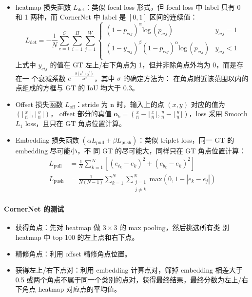 \begin{itemize}
  \item heatmap 损失函数 $L_{\mathrm{det}}$：类似 focal loss 形式，但 focal loss
    中 label 只有 0 和 1 两种，而 CornerNet 中 label 是 $[0, 1]$ 区间的连续值：
    \begin{equation}
      \label{equ:cornernet-det-loss}
      L_{\mathrm{det}} = -\frac{1}{N} \sum_{c=1}^{C} \sum_{i=1}^{H} \sum_{j=1}^{W}
      \left\{
        \begin{array}{lr}
           (1-p_{cij})^{\alpha}\mathrm{log}\,(p_{cij}) & y_{cij} = 1 \\
           (1-y_{cij})^{\beta} (1-p_{cij})^{\alpha} \mathrm{log}\,(p_{cij}) & y_{cij} < 1 \\
        \end{array}
      \right.
    \end{equation}
    上式中 $y_{cij}$ 的值在 GT 左上/右下角点为 1，但并非除角点外均为 0，而是存在一
    个衰减系数 $e^{-\frac{9(x^2+y^2)}{2\sigma^2}}$，其中 $\sigma$ 的确定方法为：
    在角点附近该范围以内的点组成的方框与 GT 的 IoU 均大于 0.3。
  \item Offset 损失函数 $L_{\mathrm{off}}$：stride 为 n 时，输入上的点 $(x, y)$
    对应的值为 $( \lfloor \frac{x}{n} \rfloor, \lfloor \frac{y}{n} \rfloor)$，
    offset 部分的真值 $\mathbf{o}_k = \left( \frac{x}{n} - \lfloor \frac{x}{n}
      \rfloor, \frac{y}{n} - \lfloor \frac{y}{n} \rfloor \right)$，loss 采用
    Smooth $L_1$ loss，且只在 GT 角点位置计算。
  \item Embedding 损失函数 $(\alpha L_{\mathrm{pull}} + \beta
    L_{\mathrm{push}})$：类似 triplet loss，同一 GT 的 embedding 尽可能小，不
    同 GT 的尽可能大，同样只在 GT 角点位置计算：
    \begin{align}
      \label{equ:cornernet-em-loss-pull}
      L_{\mathrm{pull}} & = \frac{1}{N} \sum_{k=1}^{N} \left[ (e_{t_k} - e_k)^2 + (e_{b_k} - e_k)^2 \right] \\
      \label{equ:cornernet-em-loss-push}
      L_{\mathrm{push}} & = \frac{1}{N(N-1)} \sum_{k=1}^{N} \sum_{\substack{j=1 \\ j \neq k}}^{N} \mathrm{max} (0, 1-|e_k-e_j|)
    \end{align}
\end{itemize}

\paragraph{CornerNet 的测试}
\begin{itemize}
  \item 获得角点：先对 heatmap 做 $3 \times 3$ 的 max pooling，然后挑选所有类
    别 heatmap 中 top 100 的左上点和右下点。
  \item 精修角点：利用 offset 精修角点位置。
  \item 获得左上/右下点对：利用 embedding 计算点对，筛掉 embedding 相差大于 0.5
    或两个角点不属于同一个类别的点对，获得最终结果，最终分数为左上/右下角点
    heatmap 对应点的平均值。
\end{itemize}

